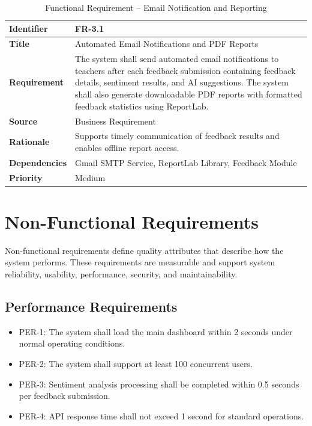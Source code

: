 \begin{table}[H]
\centering
\caption{Functional Requirement -- Email Notification and Reporting}

\begin{tabularx}{\textwidth}{|p{3cm}|X|}
\hline
\textbf{Identifier} & FR-3.1 \\
\hline
\textbf{Title} & Automated Email Notifications and PDF Reports \\
\hline
\textbf{Requirement} & The system shall send automated email notifications to teachers after each feedback submission containing feedback details, sentiment results, and AI suggestions. The system shall also generate downloadable PDF reports with formatted feedback statistics using ReportLab. \\
\hline
\textbf{Source} & Business Requirement \\
\hline
\textbf{Rationale} & Supports timely communication of feedback results and enables offline report access. \\
\hline
\textbf{Dependencies} & Gmail SMTP Service, ReportLab Library, Feedback Module \\
\hline
\textbf{Priority} & Medium \\
\hline
\end{tabularx}

\end{table}



\section{Non-Functional Requirements}

Non-functional requirements define quality attributes that describe how the system performs. 
These requirements are measurable and support system reliability, usability, performance, 
security, and maintainability.

\subsection{Performance Requirements}

\begin{itemize}
\item PER-1: The system shall load the main dashboard within 2 seconds under normal operating conditions.
\item PER-2: The system shall support at least 100 concurrent users.
\item PER-3: Sentiment analysis processing shall be completed within 0.5 seconds per feedback submission.
\item PER-4: API response time shall not exceed 1 second for standard operations.
\end{itemize}


